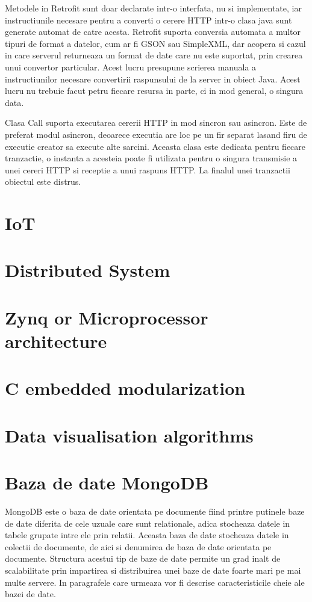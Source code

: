 Metodele in Retrofit sunt doar declarate intr-o interfata, nu si implementate, iar instructiunile necesare pentru a converti o cerere HTTP intr-o clasa java 
sunt generate automat de catre acesta. Retrofit suporta conversia automata a multor tipuri de format a datelor, cum ar fi GSON sau SimpleXML, dar acopera si 
cazul in care serverul returneaza un format de date care nu este suportat, prin crearea unui convertor particular. Acest lucru presupune scrierea 
manuala a instructiunilor necesare convertirii raspunsului de la server in obiect Java. Acest lucru nu trebuie facut petru fiecare resursa in parte, ci 
in mod general, o singura data.

Clasa Call suporta executarea cererii HTTP in mod sincron sau asincron. Este de preferat modul asincron, deoarece executia are loc pe un fir separat lasand 
firu de executie creator sa execute alte sarcini. Aceasta clasa este dedicata pentru fiecare tranzactie, o instanta a acesteia poate fi utilizata pentru 
o singura transmisie a unei cereri HTTP si receptie a unui raspuns HTTP. La finalul unei tranzactii obiectul este distrus.



\section{IoT}\label{sec:iot}
\section{Distributed System}\label{sec:distributed}
\section{Zynq or Microprocessor architecture}\label{sec:zynq}
\section{C embedded modularization}\label{sec:cembedded}
\section{Data visualisation algorithms}\label{sec:graph}
\section{Baza de date MongoDB}\label{sec:mongodb}
MongoDB este o baza de date orientata pe documente fiind printre putinele baze de date diferita de cele uzuale care sunt relationale, adica stocheaza datele in tabele 
grupate intre ele prin relatii. Aceasta baza de date stocheaza datele in colectii de documente, de aici si denumirea de baza de date orientata pe documente. 
Structura acestui tip de baze de date permite un grad inalt de scalabilitate prin impartirea si distribuirea unei baze de date foarte mari pe mai multe 
servere. In paragrafele care urmeaza vor fi descrise caracteristicile cheie ale bazei de date.

